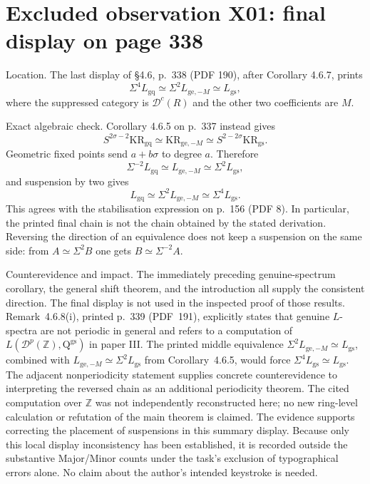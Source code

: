 \documentclass[10pt]{article}
\begin{document}
\section*{Excluded observation X01: final display on page 338}
Location. The last display of §4.6, p. 338 (PDF 190), after Corollary 4.6.7, prints \[\Sigma^4 L_{\mathrm{gq}}\simeq
 \Sigma^2 L_{\mathrm{ge},-M}\simeq L_{\mathrm{gs}},
 \tag{X01-printed}\] where the suppressed category is \(\mathcal D^c(R)\) and the other two coefficients are \(M\).\par
Exact algebraic check. Corollary 4.6.5 on p. 337 instead gives \[S^{2\sigma-2}\mathrm{KR}_{\mathrm{gq}}\simeq
 \mathrm{KR}_{\mathrm{ge},-M}\simeq S^{2-2\sigma}\mathrm{KR}_{\mathrm{gs}}.\] Geometric fixed points send \(a+b\sigma\) to degree \(a\). Therefore \[\Sigma^{-2}L_{\mathrm{gq}}\simeq
 L_{\mathrm{ge},-M}\simeq\Sigma^2L_{\mathrm{gs}},\] and suspension by two gives \[L_{\mathrm{gq}}\simeq
 \Sigma^2L_{\mathrm{ge},-M}\simeq\Sigma^4L_{\mathrm{gs}}.
 \tag{X01-derived}\] This agrees with the stabilisation expression on p. 156 (PDF 8). In particular, the printed final chain is not the chain obtained by the stated derivation. Reversing the direction of an equivalence does not keep a suspension on the same side: from \(A\simeq\Sigma^2B\) one gets \(B\simeq\Sigma^{-2}A\).\par
Counterevidence and impact. The immediately preceding genuine-spectrum corollary, the general shift theorem, and the introduction all supply the consistent direction. The final display is not used in the inspected proof of those results. Remark 4.6.8(i), printed p. 339 (PDF 191), explicitly states that genuine \(L\)-spectra are not periodic in general and refers to a computation of \(L(\mathcal D^p(\mathbb Z),\mathord{\mathrm{Q}}^{\mathrm{gs}})\) in paper III. The printed middle equivalence \(\Sigma^2L_{\mathrm{ge},-M}\simeq L_{\mathrm{gs}}\), combined with \(L_{\mathrm{ge},-M}\simeq\Sigma^2L_{\mathrm{gs}}\) from Corollary 4.6.5, would force \(\Sigma^4L_{\mathrm{gs}}\simeq L_{\mathrm{gs}}\). The adjacent nonperiodicity statement supplies concrete counterevidence to interpreting the reversed chain as an additional periodicity theorem. The cited computation over \(\mathbb Z\) was not independently reconstructed here; no new ring-level calculation or refutation of the main theorem is claimed. The evidence supports correcting the placement of suspensions in this summary display. Because only this local display inconsistency has been established, it is recorded outside the substantive Major/Minor counts under the task’s exclusion of typographical errors alone. No claim about the author’s intended keystroke is needed.\par
\end{document}
